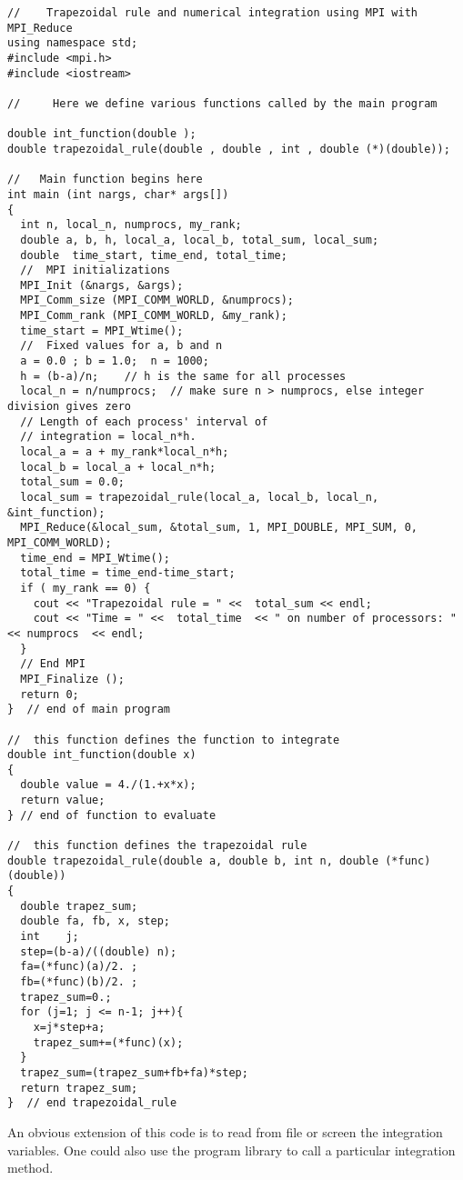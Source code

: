 \begin{lstlisting}[title={\url{http://folk.uio.no/mhjensen/compphys/programs/chapter05/program6.cpp}}]
//    Trapezoidal rule and numerical integration using MPI with MPI_Reduce
using namespace std;
#include <mpi.h>
#include <iostream>

//     Here we define various functions called by the main program

double int_function(double );
double trapezoidal_rule(double , double , int , double (*)(double));

//   Main function begins here
int main (int nargs, char* args[])
{
  int n, local_n, numprocs, my_rank;
  double a, b, h, local_a, local_b, total_sum, local_sum;
  double  time_start, time_end, total_time;
  //  MPI initializations
  MPI_Init (&nargs, &args);
  MPI_Comm_size (MPI_COMM_WORLD, &numprocs);
  MPI_Comm_rank (MPI_COMM_WORLD, &my_rank);
  time_start = MPI_Wtime();
  //  Fixed values for a, b and n
  a = 0.0 ; b = 1.0;  n = 1000;
  h = (b-a)/n;    // h is the same for all processes
  local_n = n/numprocs;  // make sure n > numprocs, else integer division gives zero
  // Length of each process' interval of
  // integration = local_n*h.
  local_a = a + my_rank*local_n*h;
  local_b = local_a + local_n*h;
  total_sum = 0.0;
  local_sum = trapezoidal_rule(local_a, local_b, local_n, &int_function);
  MPI_Reduce(&local_sum, &total_sum, 1, MPI_DOUBLE, MPI_SUM, 0, MPI_COMM_WORLD);
  time_end = MPI_Wtime();
  total_time = time_end-time_start;
  if ( my_rank == 0) {
    cout << "Trapezoidal rule = " <<  total_sum << endl;
    cout << "Time = " <<  total_time  << " on number of processors: "  << numprocs  << endl;
  }
  // End MPI
  MPI_Finalize ();
  return 0;
}  // end of main program

//  this function defines the function to integrate
double int_function(double x)
{
  double value = 4./(1.+x*x);
  return value;
} // end of function to evaluate

//  this function defines the trapezoidal rule
double trapezoidal_rule(double a, double b, int n, double (*func)(double))
{
  double trapez_sum;
  double fa, fb, x, step;
  int    j;
  step=(b-a)/((double) n);
  fa=(*func)(a)/2. ;
  fb=(*func)(b)/2. ;
  trapez_sum=0.;
  for (j=1; j <= n-1; j++){
    x=j*step+a;
    trapez_sum+=(*func)(x);
  }
  trapez_sum=(trapez_sum+fb+fa)*step;
  return trapez_sum;
}  // end trapezoidal_rule

\end{lstlisting}
An obvious extension of this code  is to read from file or screen the integration variables. One could also
use the program library to call a particular integration method.   


